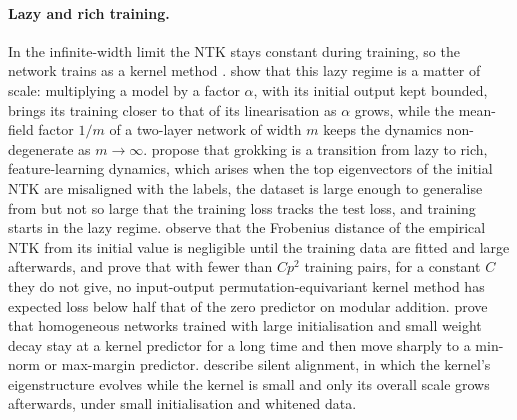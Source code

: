 \documentclass[a4paper,11pt]{article} %
\begin{document}
\paragraph{Lazy and rich training.} In the infinite-width limit the NTK stays
constant during training, so the network trains as a kernel method
\citep{jacotNeuralTangentKernel2020}.
show that this lazy regime is a matter of scale: multiplying a model by a
factor $\alpha$, with its initial output kept bounded, brings its training
closer to that of its linearisation as $\alpha$ grows, while the
mean-field factor $1/m$ of a two-layer network of
width $m$ keeps the dynamics non-degenerate as $m\to\infty$.
 propose that grokking is a transition
from lazy to rich, feature-learning dynamics, which arises when the top
eigenvectors of the initial NTK are misaligned with the labels, the dataset is
large enough to generalise from but not so large that the training loss tracks
the test loss, and training starts in the lazy regime.
 observe that the Frobenius distance of the
empirical NTK from its initial value is negligible until the training data are
fitted and large afterwards, and prove that with fewer than $Cp^2$ training
pairs, for a constant $C$ they do not give, no input-output
permutation-equivariant kernel method has expected loss below half that of the
zero predictor on modular addition.  prove that
homogeneous networks trained with large initialisation and small weight decay
stay at a kernel predictor for a long time and then move sharply to a
min-norm or max-margin predictor. 
describe silent alignment, in which the kernel's eigenstructure evolves while
the kernel is small and only its overall scale grows afterwards, under small
initialisation and whitened data.
\end{document}
